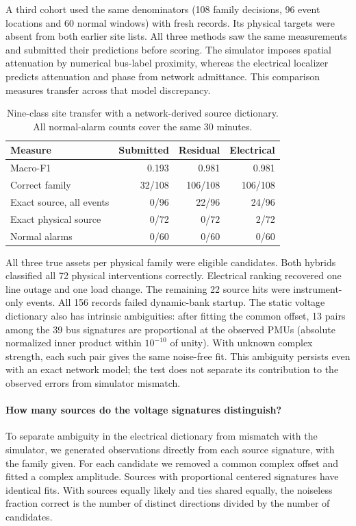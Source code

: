 A third cohort used the same denominators (108 family decisions, 96
event locations and 60 normal windows) with fresh records. Its physical targets were absent from both earlier site
lists. All three methods saw the same measurements and submitted
their predictions before scoring. The simulator imposes spatial
attenuation by numerical bus-label proximity, whereas the electrical
localizer predicts attenuation and phase from network admittance.
This comparison measures transfer across that model discrepancy.

\begin{table}[!ht]
\centering\small
\caption{Nine-class site transfer with a network-derived source dictionary.
All normal-alarm counts cover the same 30 minutes.}
\label{tab:window-electrical-sites}
\begin{tabular}{lrrr}\toprule
Measure & Submitted & Residual & Electrical\\\midrule
Macro-F1 & 0.193 & 0.981 & 0.981\\
Correct family & 32/108 & 106/108 & 106/108\\
Exact source, all events & 0/96 & 22/96 & 24/96\\
Exact physical source & 0/72 & 0/72 & 2/72\\
Normal alarms & 0/60 & 0/60 & 0/60\\\bottomrule
\end{tabular}
\end{table}

All three true assets per physical family were eligible candidates.
Both hybrids classified all 72 physical interventions correctly.
Electrical ranking recovered one line outage and one load change.
The remaining 22 source hits were instrument-only events. All 156
records failed dynamic-bank startup. The static voltage dictionary
also has intrinsic ambiguities: after fitting the common offset,
13 pairs among the 39 bus signatures are proportional at the observed
PMUs (absolute normalized inner product within $10^{-10}$ of unity).
With unknown complex strength, each such pair gives the same
noise-free fit. This ambiguity persists even with an exact network
model; the test does not separate its contribution to the observed
errors from simulator mismatch.

\paragraph{How many sources do the voltage signatures distinguish?}

To separate ambiguity in the electrical dictionary from mismatch with
the simulator, we generated observations directly from each source
signature, with the family given. For each candidate we removed a common
complex offset and fitted a complex amplitude. Sources with proportional
centered signatures have identical fits. With sources equally likely and
ties shared equally, the noiseless fraction correct is the number of
distinct directions divided by the number of candidates.

